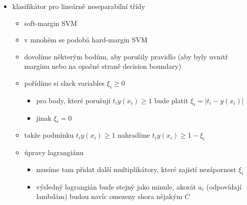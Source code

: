 \begin{itemize}
\begin{itemize}
\begin{itemize}
\begin{itemize}
\begin{itemize}
\item za předpokladu, že $t_iy(x_i)\geq 1$
\end{itemize}
\end{itemize}
\item tuhle minimalizaci s omezující podmínkou provádíme pomocí lagrangiánu a KKT podmínek
\begin{itemize}
\item místo multiplikátorů $\lambda_i$ se tradičně používají $a_i$
\end{itemize}
\item díky KKT podmínkám víme, že nás při maximalizaci lagrangiánu zajímají jenom některá trénovací data - ta, která leží na okraji (support vektory)
\begin{itemize}
\item je tam podmínka $a_i(t_iy(x_i)-1)=0$
\item z toho vyplývá, že pro každé $x_i$ platí $t_iy(x_i)=1$ (bod je na marginu) nebo $a_i=0$ (bod se nepoužívá k predikci)
\end{itemize}
\end{itemize}
\item predikce \dots{} $y(x)=\sum_i a_it_iK(x,x_i)+b$
\end{itemize}
\item klasifikátor pro lineárně neseparabilní třídy
\begin{itemize}
\item soft-margin SVM
\item v mnohém se podobá hard-margin SVM
\item dovolíme některým bodům, aby porušily pravidlo (aby byly uvnitř marginu nebo na opačné straně decision boundary)
\item pořídíme si slack variables $\xi_i\geq 0$
\begin{itemize}
\item pro body, které porušují $t_iy(x_i)\geq1$ bude platit $\xi_i=|t_i-y(x_i)|$
\item jinak $\xi_i=0$
\end{itemize}
\item takže podmínku $t_iy(x_i)\geq1$ nahradíme $t_iy(x_i)\geq1-\xi_i$
\item úpravy lagrangiánu
\begin{itemize}
\item musíme tam přidat další multiplikátory, které zajistí nezápornost $\xi_i$
\item výsledný lagrangián bude stejný jako minule, akorát $a_i$ (odpovídají lambdám) budou navíc omezeny shora nějakým $C$

\end{itemize}
\end{itemize}
\end{itemize}
